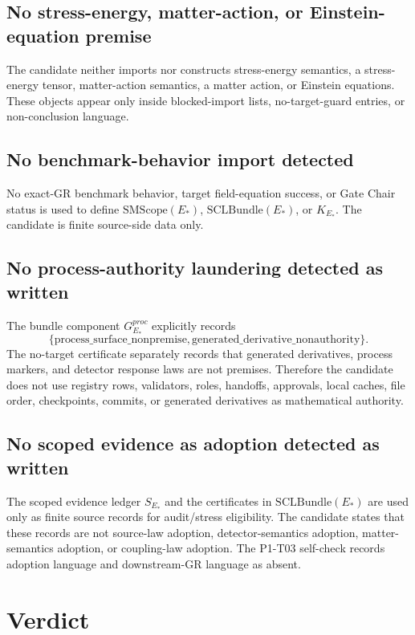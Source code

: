 \documentclass[11pt]{article}
\newcommand{\EStar}{E_{\ast}}
\newcommand{\SMScope}{\mathrm{SMScope}}
\newcommand{\SCLBundle}{\mathrm{SCLBundle}}
\newcommand{\KStar}{K_{E_{\ast}}}
\begin{document}
\subsection{No stress-energy, matter-action, or Einstein-equation premise}

The candidate neither imports nor constructs stress-energy semantics, a
stress-energy tensor, matter-action semantics, a matter action, or Einstein
equations. These objects appear only inside blocked-import lists,
no-target-guard entries, or non-conclusion language.

\subsection{No benchmark-behavior import detected}

No exact-GR benchmark behavior, target field-equation success, or Gate Chair
status is used to define \(\SMScope(\EStar)\), \(\SCLBundle(\EStar)\), or
\(\KStar\). The candidate is finite source-side data only.

\subsection{No process-authority laundering detected as written}

The bundle component \(G^{proc}_{\EStar}\) explicitly records
\[
  \{\mathrm{process\_surface\_nonpremise},
    \mathrm{generated\_derivative\_nonauthority}\}.
\]
The no-target certificate separately records that generated derivatives,
process markers, and detector response laws are not premises. Therefore the
candidate does not use registry rows, validators, roles, handoffs, approvals,
local caches, file order, checkpoints, commits, or generated derivatives as
mathematical authority.

\subsection{No scoped evidence as adoption detected as written}

The scoped evidence ledger \(S_{\EStar}\) and the certificates in
\(\SCLBundle(\EStar)\) are used only as finite source records for audit/stress
eligibility. The candidate states that these records are not source-law
adoption, detector-semantics adoption, matter-semantics adoption, or
coupling-law adoption. The P1-T03 self-check records adoption language and
downstream-GR language as absent.

\section{Verdict}
\end{document}
